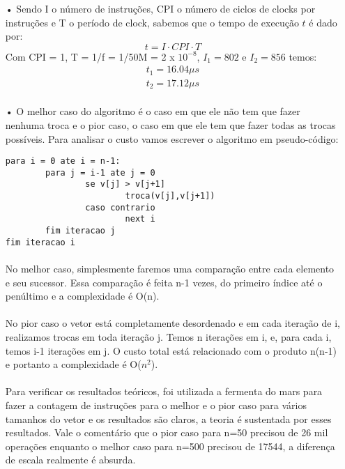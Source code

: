 \begin{itemize}
	\item[•]
		Sendo I o número de instruções, CPI o número de ciclos de clocks
		por instruções e T o período de clock, sabemos que o tempo de execução
		$t$ é dado por:
		\begin{equation}
			t = I \cdot CPI \cdot T
		\end{equation}
		Com CPI = 1, T = 1/f = 1/50M = 2 x $10^{-8}$, $I_1 = 802$ e $I_2 = 856$
		temos:
		\begin{equation}
			\begin{array}{l}
				t_{1} = 16.04 \mu s \\
				t_{2} = 17.12 \mu s \\
			\end{array}
		\end{equation}		 
		
	\item[•]
	O melhor caso do algoritmo é o caso em que ele não tem que fazer nenhuma troca e o pior caso, o caso em que ele tem que fazer todas as trocas possíveis. Para analisar o custo vamos escrever o algoritmo em pseudo-código:

	\begin{verbatim}
para i = 0 ate i = n-1:
        para j = i-1 ate j = 0
                se v[j] > v[j+1]
                        troca(v[j],v[j+1])
                caso contrario
                        next i
        fim iteracao j
fim iteracao i
	\end{verbatim}

       \paragraph{} No melhor caso, simplesmente faremos uma comparação entre cada elemento
        e seu sucessor. Essa comparação é feita n-1 vezes, do primeiro índice
        até o penúltimo e a complexidade é O(n).

       \paragraph{} No pior caso o vetor está completamente desordenado e em cada iteração
        de i, realizamos trocas em toda iteração j. Temos n iterações em i, 
        e, para cada i, temos i-1 iterações em j. O custo total está relacionado 
        com o produto n(n-1) e portanto a complexidade é O($n^2$).

         \paragraph{}Para verificar os resultados teóricos, foi utilizada a fermenta do mars para fazer a contagem de instruções para o melhor e o pior caso para vários tamanhos do vetor e os resultados são claros, a teoria é sustentada por esses resultados. Vale o comentário que o pior caso para n=50 precisou de 26 mil operações enquanto o melhor caso para n=500 precisou de 17544, a diferença de escala realmente é absurda.
         

\end{itemize}
